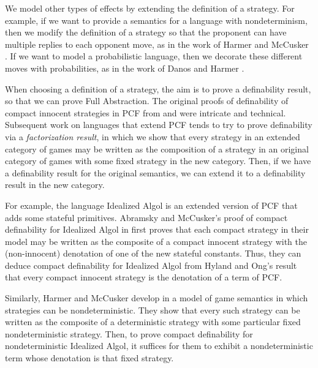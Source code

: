 We model other types of effects by extending the definition of a strategy.  
For example, if we want to provide a semantics for a language with nondeterminism, then we modify the definition of a strategy so that the proponent can have multiple replies to each opponent move, as in the work of Harmer and McCusker \cite{mcCHFiniteND}.
If we want to model a probabilistic language, then we decorate these different moves with probabilities, as in the work of Danos and Harmer \cite{DanosHarmer}.

When choosing a definition of a strategy, the aim is to prove a definability result, so that we can prove Full Abstraction.  
The original proofs of definability of compact innocent strategies in PCF from \cite{ajmPcf} and \cite{hoPcf} were intricate and technical.  
Subsequent work on languages that extend PCF tends to try to prove definability via a \emph{factorization result}, in which we show that every strategy in an extended category of games may be written as the composition of a strategy in an original category of games with some fixed strategy in the new category.  
Then, if we have a definability result for the original semantics, we can extend it to a definability result in the new category.

For example, the language Idealized Algol is an extended version of PCF that adds some stateful primitives.
Abramsky and McCusker's proof of compact definability for Idealized Algol in \cite{SamsonGuyIAActive} first proves that each compact strategy in their model may be written as the composite of a compact innocent strategy with the (non-innocent) denotation of one of the new stateful constants.  
Thus, they can deduce compact definability for Idealized Algol from Hyland and Ong's result that every compact innocent strategy is the denotation of a term of PCF.  

Similarly, Harmer and McCusker develop in \cite{mcCHFiniteND} a model of game semantics in which strategies can be nondeterministic.  
They show that every such strategy can be written as the composite of a deterministic strategy with some particular fixed nondeterministic strategy.  
Then, to prove compact definability for nondeterministic Idealized Algol, it suffices for them to exhibit a nondeterministic term whose denotation is that fixed strategy.

